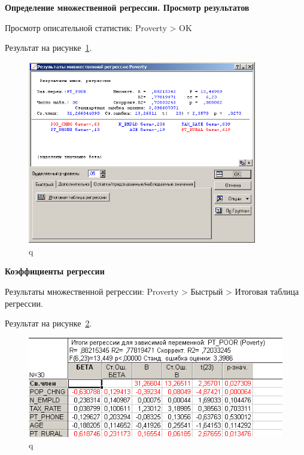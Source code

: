 \newpage

\begin{center}
  \textbf{Определение множественной регрессии. Просмотр результатов}
\end{center}

Просмотр описательной статистик: Proverty > OK

Результат на рисунке~\ref{fig:example_19}.

\begin{figure}[!h]
  \centering

  \includegraphics[height=8cm]
  {inc/example_19.PNG}

  \caption{q}

  \label{fig:example_19}
\end{figure}

\newpage

\begin{center}
  \textbf{Коэффициенты регрессии}
\end{center}

Результаты множественной регрессии: Proverty > Быстрый > Итоговая таблица регрессии.

Результат на рисунке~\ref{fig:example_20}.

\begin{figure}[!h]
  \centering

  \includegraphics[width=12cm]
  {inc/example_20.PNG}

  \caption{q}

  \label{fig:example_20}
\end{figure}

